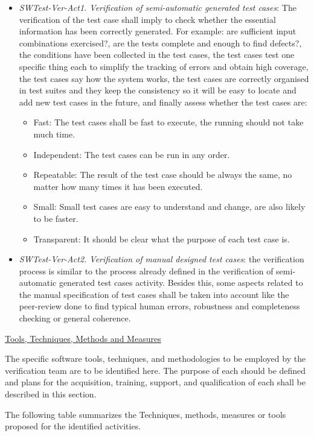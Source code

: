 \documentclass{template/openetcs_report}
\begin{document}
\begin{itemize}
\item {\it SWTest-Ver-Act1. Verification of semi-automatic generated test cases}: The verification of the test case shall imply to check whether the essential information has been correctly generated. For example: are sufficient input combinations exercised?, are the tests complete and enough to find defects?, the conditions have been collected in the test cases, the test cases test one specific thing each to simplify the tracking of errors and obtain high coverage, the test cases say how the system works, the test cases are correctly organised in test suites and they keep the consistency so it will be easy to locate and add new test cases in the future, and finally assess whether the test cases are:
\begin{itemize}
\item Fast: The test cases shall be fast to execute, the running should not take much time. 
\item Independent: The test cases can be run in any order. 
\item Repeatable: The result of the test case should be always the same, no matter how many times it has been executed. 
\item Small: Small test cases are easy to understand and change, are also likely to be faster. 
\item Transparent: It should be clear what the purpose of each test case is.
\end{itemize} 
\item {\it SWTest-Ver-Act2. Verification of manual designed test cases}: the verification process is similar to the process already defined in the verification of semi-automatic generated test cases activity. Besides this, some aspects related to the manual specification of test cases shall be taken into account like the peer-review done to find typical human errors, robustness and completeness checking    or general coherence.
\end{itemize}


\underline{Tools, Techniques, Methods and Measures} 

The specific software tools, techniques, and methodologies to be
employed by the verification team are to be identified here. 
The purpose of each should be defined and plans for the acquisition,
training, support, and qualification of each shall be described in
this section. 

The following table summarizes the Techniques, methods, measures or tools proposed for the identified activities.
\end{document}
